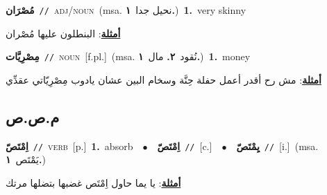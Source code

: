 \documentclass[10pt,a4paper,twoside]{article} %
\begin{document}
\begin{multicols}{2}
{\setlength\topsep{0pt}\textbf{\foreignlanguage{arabic}{مُصْرَان}}\ {\color{gray}\texttt{//}\color{black}}\ \textsc{adj/noun}\ \color{gray}(msa. \foreignlanguage{arabic}{نحيل جدا}~\foreignlanguage{arabic}{\textbf{١.}})\color{black}\ \textbf{1.}~very skinny\  \begin{flushright}\color{gray}\foreignlanguage{arabic}{\textbf{\underline{\foreignlanguage{arabic}{أمثلة}}}: البنطلون عليها مُصْران}\end{flushright}\color{black}} \vspace{2mm}

{\setlength\topsep{0pt}\textbf{\foreignlanguage{arabic}{مِصْرِيَّات}}\ {\color{gray}\texttt{//}\color{black}}\ \textsc{noun}\ [f.pl.]\ \color{gray}(msa. \foreignlanguage{arabic}{نُقود}~\foreignlanguage{arabic}{\textbf{٢.}}  \foreignlanguage{arabic}{مال}~\foreignlanguage{arabic}{\textbf{١.}})\color{black}\ \textbf{1.}~money\  \begin{flushright}\color{gray}\foreignlanguage{arabic}{\textbf{\underline{\foreignlanguage{arabic}{أمثلة}}}: مش رح أقدر أعمل حفلة حِنَّة وسخام البين عشان يادوب مِصْرِيّاتي عقدِّي}\end{flushright}\color{black}} \vspace{2mm}

\vspace{-3mm}
\subsection*{\color{blue}\foreignlanguage{arabic}{م.ص.ص}\color{blue}{}} 

{\setlength\topsep{0pt}\textbf{\foreignlanguage{arabic}{اِمْتَصّ}}\ {\color{gray}\texttt{//}\color{black}}\ \textsc{verb}\ [p.]\ \textbf{1.}~absorb\ \ $\bullet$\ \ \setlength\topsep{0pt}\textbf{\foreignlanguage{arabic}{اِمْتَصّ}}\ {\color{gray}\texttt{//}\color{black}}\ [c.]\ \ $\bullet$\ \ \setlength\topsep{0pt}\textbf{\foreignlanguage{arabic}{يِمْتَصّ}}\ {\color{gray}\texttt{//}\color{black}}\ [i.]\ \color{gray}(msa. \foreignlanguage{arabic}{يَمْتَص}~\foreignlanguage{arabic}{\textbf{١.}})\color{black}\  \begin{flushright}\color{gray}\foreignlanguage{arabic}{\textbf{\underline{\foreignlanguage{arabic}{أمثلة}}}: يا يما حاول اِمْتَص غضبها بتضلها مرتك}\end{flushright}\color{black}} \vspace{2mm}


\end{multicols}
\end{document}
